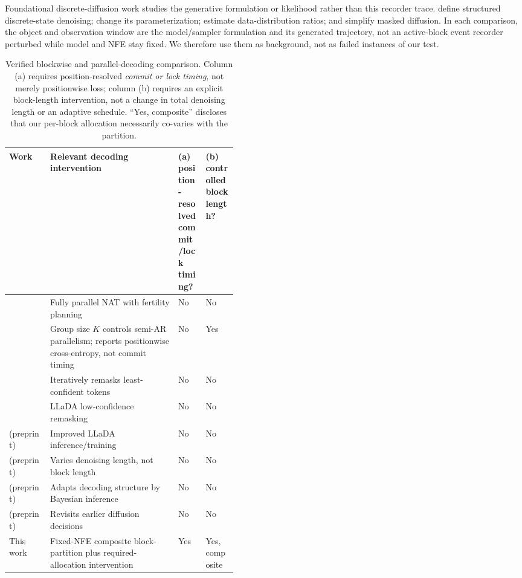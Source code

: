 \documentclass{article}
\begin{document}
Foundational discrete-diffusion work studies the generative formulation or
likelihood rather than this recorder trace. \citet{austin2021structured} define
structured discrete-state denoising; \citet{zheng2023reparameterized} change its
parameterization; \citet{lou2024discrete} estimate data-distribution ratios; and
\citet{shi2024simplified} simplify masked diffusion. In each comparison, the
object and observation window are the model/sampler formulation and its generated
trajectory, not an active-block event recorder perturbed while model and NFE stay
fixed. We therefore use them as background, not as failed instances of our test.

\begin{table}[H]
\centering
\footnotesize
\setlength{\tabcolsep}{2.4pt}
\begin{tabularx}{\linewidth}{@{}>{\raggedright\arraybackslash}p{0.18\linewidth}
  >{\raggedright\arraybackslash}X
  >{\centering\arraybackslash}p{0.12\linewidth}
  >{\centering\arraybackslash}p{0.14\linewidth}@{}}
\toprule
Work & Relevant decoding intervention & (a) position-resolved commit/lock timing? & (b) controlled block length? \\
\midrule
\citet{gu2018nonautoregressive} & Fully parallel NAT with fertility planning & No & No \\
\citet{wang2018semi} & Group size $K$ controls semi-AR parallelism; reports positionwise cross-entropy, not commit timing & No & Yes \\
\citet{ghazvininejad2019maskpredict} & Iteratively remasks least-confident tokens & No & No \\
\citet{nie2025large} & LLaDA low-confidence remasking & No & No \\
\citet{nie2026improved} (preprint) & Improved LLaDA inference/training & No & No \\
\citet{li2025beyond} (preprint) & Varies denoising length, not block length & No & No \\
\citet{sun2026dystruct} (preprint) & Adapts decoding structure by Bayesian inference & No & No \\
\citet{wang2026reversible} (preprint) & Revisits earlier diffusion decisions & No & No \\
This work & Fixed-NFE composite block-partition plus required-allocation intervention & Yes & Yes, composite \\
\bottomrule
\end{tabularx}
\caption{Verified blockwise and parallel-decoding comparison. Column (a) requires
position-resolved \emph{commit or lock timing}, not merely positionwise loss;
column (b) requires an explicit block-length intervention, not a change in total
denoising length or an adaptive schedule. ``Yes, composite'' discloses that our
per-block allocation necessarily co-varies with the partition.}
\label{tab:blockwise}
\end{table}
\end{document}
